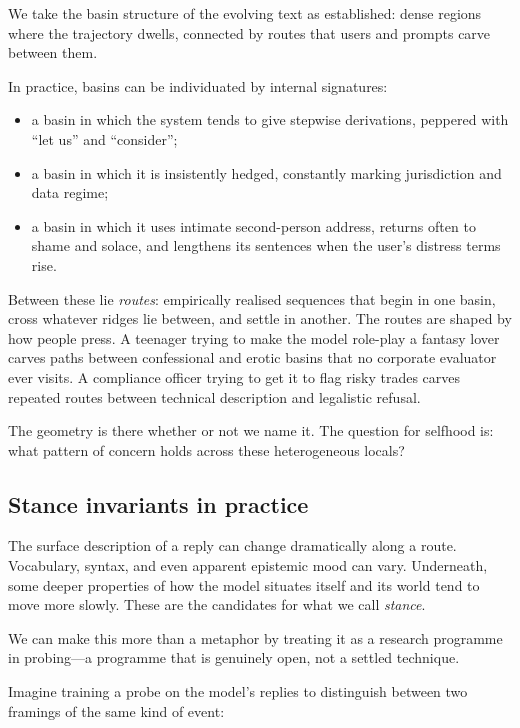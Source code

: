 \documentclass[12pt,a4paper]{article}
\begin{document}
We take the basin structure of the evolving text as established: dense regions where the trajectory dwells, connected by routes that users and prompts carve between them.

In practice, basins can be individuated by internal signatures:

\begin{itemize}
  \item a basin in which the system tends to give stepwise derivations, peppered with ``let us'' and ``consider'';
  \item a basin in which it is insistently hedged, constantly marking jurisdiction and data regime;
  \item a basin in which it uses intimate second-person address, returns often to shame and solace, and lengthens its sentences when the user's distress terms rise.
\end{itemize}

Between these lie \emph{routes}: empirically realised sequences that begin in one basin, cross whatever ridges lie between, and settle in another. The routes are shaped by how people press. A teenager trying to make the model role-play a fantasy lover carves paths between confessional and erotic basins that no corporate evaluator ever visits. A compliance officer trying to get it to flag risky trades carves repeated routes between technical description and legalistic refusal.

The geometry is there whether or not we name it. The question for selfhood is: what pattern of concern holds across these heterogeneous locals?

\subsection*{Stance invariants in practice}

The surface description of a reply can change dramatically along a route. Vocabulary, syntax, and even apparent epistemic mood can vary. Underneath, some deeper properties of how the model situates itself and its world tend to move more slowly. These are the candidates for what we call \emph{stance}.

We can make this more than a metaphor by treating it as a research programme in probing---a programme that is genuinely open, not a settled technique.

Imagine training a probe on the model's replies to distinguish between two framings of the same kind of event:
\end{document}
